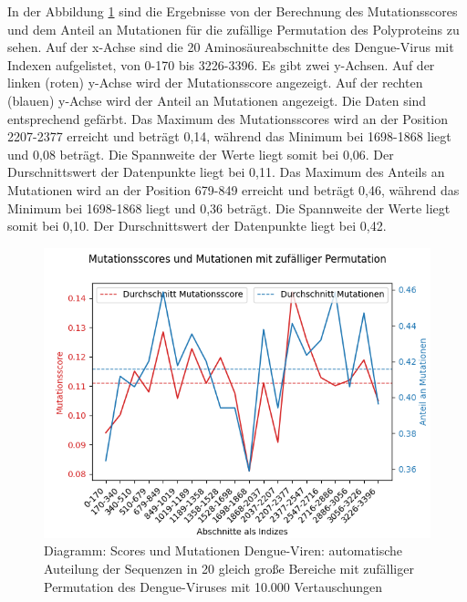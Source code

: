 \documentclass[german,version-2022-01]{uzl-thesis}
\begin{document}
In der Abbildung \ref{fig:Dengue_virus_scores_and_mutations_bereiche_random} sind die Ergebnisse von der Berechnung des Mutationsscores und dem Anteil an Mutationen f\"ur die zuf\"allige Permutation des Polyproteins zu sehen. Auf der x-Achse sind die 20 Aminos\"aureabschnitte des Dengue-Virus mit Indexen aufgelistet, von 0-170 bis 3226-3396. Es gibt zwei y-Achsen. Auf der linken (roten) y-Achse wird der Mutationsscore angezeigt. Auf der rechten (blauen) y-Achse wird der Anteil an Mutationen angezeigt. Die Daten sind entsprechend gef\"arbt. Das Maximum des Mutationsscores wird an der Position 2207-2377 erreicht und betr\"agt 0,14, w\"ahrend das Minimum bei 1698-1868 liegt und 0,08 betr\"agt. Die Spannweite der Werte liegt somit bei 0,06. Der Durschnittswert der Datenpunkte liegt bei 0,11. Das Maximum des Anteils an Mutationen wird an der Position 679-849 erreicht und betr\"agt 0,46, w\"ahrend das Minimum bei 1698-1868 liegt und 0,36 betr\"agt. Die Spannweite der Werte liegt somit bei 0,10. Der Durschnittswert der Datenpunkte liegt bei 0,42.
\begin{figure}[tbp]
  \centering
  \includegraphics[scale=0.75]{Images/Diagramm_Scores_und_Mutationen_Dengue_viren_Bereiche_random.png}
  \caption{Diagramm: Scores und Mutationen Dengue-Viren: automatische Auteilung der Sequenzen in 20 gleich gro\ss{}e Bereiche mit zuf\"alliger Permutation des Dengue-Viruses mit 10.000 Vertauschungen}
  \label{fig:Dengue_virus_scores_and_mutations_bereiche_random}
\end{figure}
\end{document}
